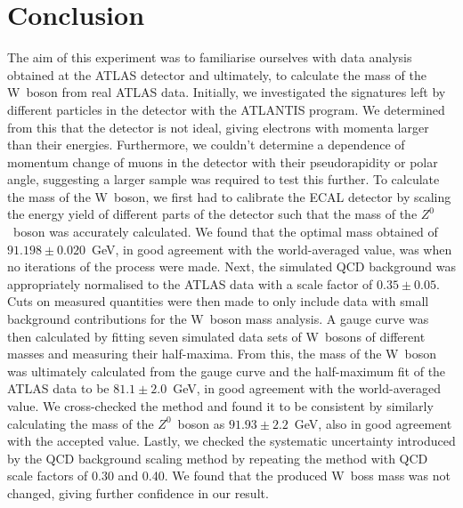 \documentclass[twocolumn]{article}
\begin{document}
\section{Conclusion}
The aim of this experiment was to familiarise ourselves with data analysis obtained at the ATLAS detector and ultimately, to calculate the mass of the W~boson from real ATLAS data. Initially, we investigated the signatures left by different particles in the detector with the ATLANTIS program. We determined from this that the detector is not ideal, giving electrons with momenta larger than their energies. Furthermore, we couldn't determine a dependence of momentum change of muons in the detector with their pseudorapidity or polar angle, suggesting a larger sample was required to test this further. To calculate the mass of the W~boson, we first had to calibrate the ECAL detector by scaling the energy yield of different parts of the detector such that the mass of the $Z^0$~boson was accurately calculated. We found that the optimal mass obtained of $91.198 \pm 0.020$~GeV, in good agreement with the world-averaged value, was when no iterations of the process were made. Next, the simulated QCD background was appropriately normalised to the ATLAS data with a scale factor of $0.35 \pm 0.05$. Cuts on measured quantities were then made to only include data with small background contributions for the W~boson mass analysis. A gauge curve was then calculated by fitting seven simulated data sets of W~bosons of different masses and measuring their half-maxima. From this, the mass of the W~boson was ultimately calculated from the gauge curve and the half-maximum fit of the ATLAS data to be $81.1 \pm 2.0$~GeV, in good agreement with the world-averaged value. We cross-checked the method and found it to be consistent by similarly calculating the mass of the $Z^0$~boson as $91.93 \pm 2.2$~GeV, also in good agreement with the accepted value. Lastly, we checked the systematic uncertainty introduced by the QCD background scaling method by repeating the method with QCD scale factors of 0.30 and 0.40. We found that the produced W~boss mass was not changed, giving further confidence in our result.
\end{document}
